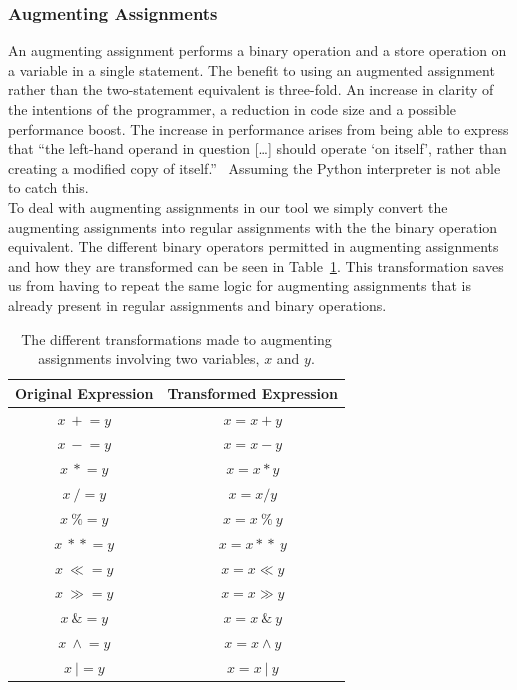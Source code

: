\documentclass[12pt, titlepage]{article}
\begin{document}
\subsubsection{Augmenting Assignments}
An augmenting assignment performs a binary operation and a store operation on a variable in a single statement. The benefit to using an augmented assignment rather than the two-statement equivalent is three-fold. An increase in clarity of the intentions of the programmer, a reduction in code size and a possible performance boost. The increase in performance arises from being able to express that ``the left-hand operand in question [\ldots] should operate `on itself', rather than creating a modified copy of itself.''~\cite{pepAugAssign} Assuming the Python interpreter is not able to catch this. \\
\indent To deal with augmenting assignments in our tool we simply convert the augmenting assignments into regular assignments with the the binary operation equivalent. The different binary operators permitted in augmenting assignments and how they are transformed can be seen in Table~\ref{table:augAssign}. This transformation saves us from having to repeat the same logic for augmenting assignments that is already present in regular assignments and binary operations.

	\begin{table}
	\centering
    \begin{tabular}{ | c | c |}
    \hline
    \textbf{Original Expression} & \textbf{Transformed Expression}  \\ \hline
    $x \: +\!= y$ & $x = x + y$   \\ \hline
    $x \: -\!= y$ & $x = x - y$   \\ \hline
    $x \: *\!= y$ & $x = x * y$   \\ \hline
    $x \: /\!= y$ & $x = x / y$   \\ \hline
    $x \: \%\!= y$ & $x = x \: \% \: y$   \\ \hline
    $x \: *\!*\!= y$ & $x = x *\!* \: y$   \\ \hline
    $x \: \ll = y$ & $x = x \ll y$   \\ \hline
    $x \: \gg = y$ & $x = x \gg y$   \\ \hline
    $x \: \&\!= y$ & $x = x \: \& \: y$   \\ \hline
    $x \: \wedge\!= y$ & $x = x \wedge y$   \\ \hline
    $x \: |= y$ & $x = x \: | \: y$   \\ \hline
    \end{tabular}
    \caption{The different transformations made to augmenting assignments involving two variables, $x$ and $y$.}
	\label{table:augAssign}
    \end{table}
\end{document}
